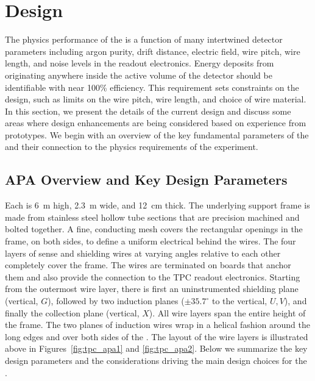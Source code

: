 \section{Design}
\label{sec:fdsp-apa-design}

The physics performance of the  is a function of many intertwined detector parameters including argon purity, drift distance, electric field, wire pitch, wire length, and noise levels in the readout electronics.  Energy deposits from %
originating anywhere inside the active volume of the detector should be identifiable with near \num{100}\% efficiency.  This requirement sets constraints on the  design, such as limits on the wire pitch, wire length, and choice of wire material.  In this section, we present the details of the current %
 design and discuss some areas where design enhancements are being considered based on experience from prototypes.  We begin with an overview of the key fundamental parameters of the  and their connection to the physics requirements of the experiment. 


\subsection{APA Overview and Key Design Parameters}
\label{sec:fdsp-apa-design-overview}

Each  is \SI{6}{m} high, \SI{2.3}{m} wide, and \SI{12}{cm} thick.  The underlying support frame is made from stainless steel hollow tube sections that are precision machined and bolted together. A fine,   conducting mesh covers the rectangular openings in the frame, on both sides, to define a uniform electrical  behind the wires. The four layers of sense and shielding wires at varying angles relative to each other completely cover the frame. The wires are terminated on boards that anchor them and also provide the connection to the TPC readout electronics. Starting from the outermost wire layer, there is first an uninstrumented shielding plane (vertical, $G$), followed by two induction planes ($\pm 35.7^{\circ}$ to the vertical, $U,V$), and finally the collection plane (vertical, $X$). All wire layers span the entire height of the  frame. The two planes of induction wires wrap in a helical fashion around the long edges and over both sides of the . The layout of the wire layers is illustrated above in Figures~\ref{fig:tpc_apa1} and \ref{fig:tpc_apa2}.  Below we summarize the key design parameters and the considerations driving the main design choices for the .  %

